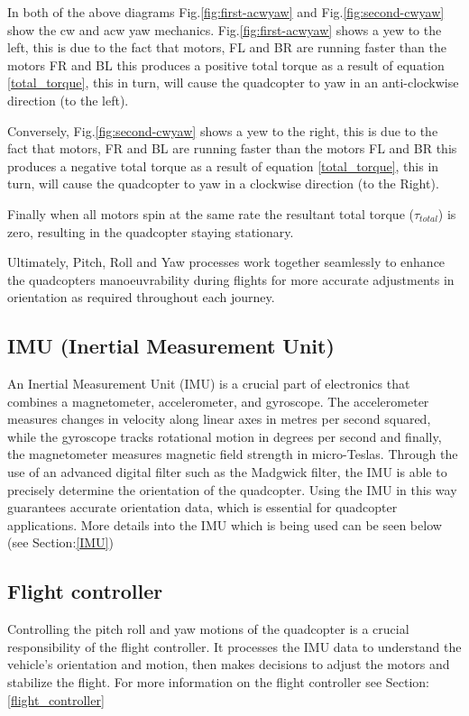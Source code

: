 \documentclass{report}
\begin{document}
In both of the above diagrams Fig.\ref{fig:first-acwyaw} and
Fig.\ref{fig:second-cwyaw} show the cw and acw yaw mechanics.
Fig.\ref{fig:first-acwyaw} shows a yew to the left, this is due to the fact that
motors, FL and BR are running faster than the motors FR and BL this produces a
positive total torque as a result of equation \ref{total_torque}, this in turn,
will cause the quadcopter to yaw in an anti-clockwise direction (to the left).

Conversely, Fig.\ref{fig:second-cwyaw}  shows a yew to the right, this is due to
the fact that motors, FR and BL are running faster than the motors FL and BR
this produces a negative total torque as a result of equation
\ref{total_torque}, this in turn,  will cause the quadcopter to yaw in a
clockwise direction (to the Right).

Finally when all motors spin at the same rate the resultant total torque
(\(\tau_{total}\)) is zero, resulting in the quadcopter staying stationary.


Ultimately, Pitch, Roll and Yaw processes work together seamlessly to enhance
the quadcopters manoeuvrability during flights for more accurate adjustments in
orientation as required throughout each journey.

\subsection{IMU (Inertial Measurement Unit)}
An Inertial Measurement Unit (IMU) is a crucial part of electronics that
combines a magnetometer, accelerometer, and gyroscope. The accelerometer
measures changes in velocity along linear axes in metres per second squared,
while the gyroscope tracks rotational motion in degrees per second and finally,
the magnetometer measures magnetic field strength in micro-Teslas. Through the
use of an advanced digital filter such as the Madgwick filter, the IMU is able to precisely determine the
orientation of the quadcopter. Using the IMU in this way guarantees accurate
orientation data, which is essential for quadcopter applications. More
details into the IMU which is being used can be seen below (see Section:\ref{IMU})

\subsection{Flight controller}
Controlling the pitch roll and yaw motions of the quadcopter is a crucial
responsibility of the flight controller. It processes the IMU data to understand
the vehicle's orientation and motion, then makes decisions to adjust the motors
and stabilize the flight. For more information on the flight controller
see Section:\ref{flight_controller}
\end{document}
